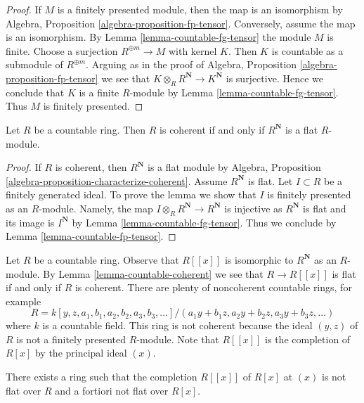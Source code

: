 \begin{proof}
If $M$ is a finitely presented module, then the map is an isomorphism
by Algebra, Proposition \ref{algebra-proposition-fp-tensor}. Conversely,
assume the map is an isomorphism. By Lemma \ref{lemma-countable-fg-tensor}
the module $M$ is finite. Choose a surjection $R^{\oplus m} \to M$ with
kernel $K$. Then $K$ is countable as a submodule of $R^{\oplus m}$.
Arguing as in the proof of Algebra, Proposition
\ref{algebra-proposition-fp-tensor} we see that
$K \otimes_R R^\mathbf{N} \to K^\mathbf{N}$ is surjective.
Hence we conclude that $K$ is a finite $R$-module by
Lemma \ref{lemma-countable-fg-tensor}.
Thus $M$ is finitely presented.
\end{proof}

\begin{lemma}
\label{lemma-countable-coherent}
Let $R$ be a countable ring. Then $R$ is coherent if and only if
$R^\mathbf{N}$ is a flat $R$-module.
\end{lemma}

\begin{proof}
If $R$ is coherent, then $R^\mathbf{N}$ is a flat module by
Algebra, Proposition \ref{algebra-proposition-characterize-coherent}.
Assume $R^\mathbf{N}$ is flat. Let $I \subset R$ be a finitely
generated ideal. To prove the lemma we show that $I$ is finitely
presented as an $R$-module. Namely, the map
$I \otimes_R R^\mathbf{N} \to R^\mathbf{N}$ is
injective as $R^\mathbf{N}$ is flat and its image is
$I^\mathbf{N}$ by Lemma \ref{lemma-countable-fg-tensor}.
Thus we conclude by Lemma \ref{lemma-countable-fp-tensor}.
\end{proof}

\noindent
Let $R$ be a countable ring. Observe that $R[[x]]$ is isomorphic to
$R^\mathbf{N}$ as an $R$-module. By Lemma \ref{lemma-countable-coherent}
we see that $R \to R[[x]]$ is flat if and only if $R$ is coherent.
There are plenty of noncoherent countable rings, for example
$$
R = k[y, z, a_1, b_1, a_2, b_2, a_3, b_3, \ldots]/
(a_1 y + b_1 z, a_2 y + b_2 z, a_3 y + b_3 z, \ldots)
$$
where $k$ is a countable field. This ring is not coherent because
the ideal $(y, z)$ of $R$ is not a finitely presented $R$-module.
Note that $R[[x]]$ is the completion of $R[x]$ by the principal
ideal $(x)$.

\begin{lemma}
\label{lemma-completion-polynomial-ring-not-flat}
There exists a ring such that the completion $R[[x]]$ of $R[x]$
at $(x)$ is not flat over $R$ and a fortiori not flat over $R[x]$.
\end{lemma}

